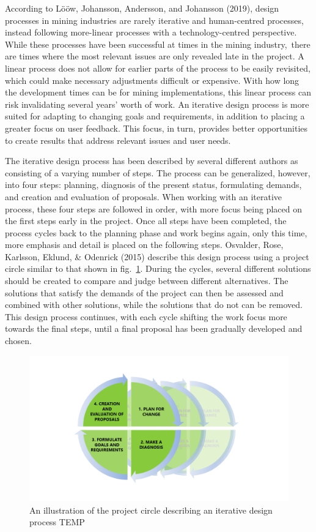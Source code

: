 \documentclass[
  12pt,
]{scrbook}
\begin{document}
According to Lööw, Johansson, Andersson, and Johansson (2019), design processes in mining industries are rarely iterative and human-centred processes, instead following more-linear processes with a technology-centred perspective. While these processes have been successful at times in the mining industry,~there are times where the most relevant issues are only revealed late in the project. A linear process does not allow for earlier parts of the process to be easily revisited, which could make necessary adjustments difficult or expensive. With how long the development times can be for mining implementations, this linear process can risk invalidating several years' worth of work. An iterative design process is more suited for adapting to changing goals and requirements, in addition to placing a greater focus on user feedback. This focus, in turn, provides better opportunities to create results that address relevant issues and user needs.

The iterative design process has been described by several different authors as consisting of a varying number of steps. The process can be generalized, however, into four steps: planning, diagnosis of the present status, formulating demands, and creation and evaluation of proposals. When working with an iterative process, these four steps are followed in order, with more focus being placed on the first steps early in the project. Once all steps have been completed, the process cycles back to the planning phase and work begins again, only this time, more emphasis and detail is placed on the following steps. Osvalder, Rose, Karlsson, Eklund, \& Odenrick (2015) describe this design process using a project circle similar to that shown in fig.~\ref{fig:figure201}. During the cycles, several different solutions should be created to compare and judge between different alternatives. The solutions that satisfy the demands of the project can then be assessed and combined with other solutions, while the solutions that do not can be removed. This design process continues, with each cycle shifting the work focus more towards the final steps, until a final proposal has been gradually developed and chosen.

\begin{figure}
\hypertarget{fig:figure201}{%
\centering
\includegraphics{./media/21-iterative-design-of-mining-workplaces/media/image1.png}
\caption{An illustration of the project circle describing an iterative design process TEMP}\label{fig:figure201}
}
\end{figure}
\end{document}
